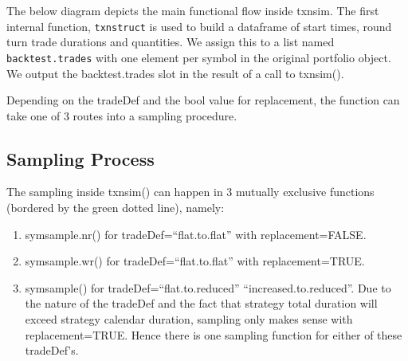 The below diagram depicts the main functional flow inside txnsim. The
first internal function, \texttt{txnstruct} is used to build a dataframe
of start times, round turn trade durations and quantities. We assign
this to a list named \texttt{backtest.trades} with one element per
symbol in the original portfolio object. We output the backtest.trades
slot in the result of a call to txnsim().

\begin{Schunk}
\end{Schunk}

Depending on the tradeDef and the bool value for replacement, the
function can take one of 3 routes into a sampling procedure.

\hypertarget{sampling-process}{%
\subsection{Sampling Process}\label{sampling-process}}

The sampling inside txnsim() can happen in 3 mutually exclusive
functions (bordered by the green dotted line), namely:

\begin{enumerate}
\def\labelenumi{\arabic{enumi}.}
\tightlist
\item
  symsample.nr() for tradeDef=``flat.to.flat'' with replacement=FALSE.
\item
  symsample.wr() for tradeDef=``flat.to.flat'' with replacement=TRUE.
\item
  symsample() for tradeDef=``flat.to.reduced'' \textbar{}
  ``increased.to.reduced''. Due to the nature of the tradeDef and the
  fact that strategy total duration will exceed strategy calendar
  duration, sampling only makes sense with replacement=TRUE. Hence there
  is one sampling function for either of these tradeDef's.
\end{enumerate}

